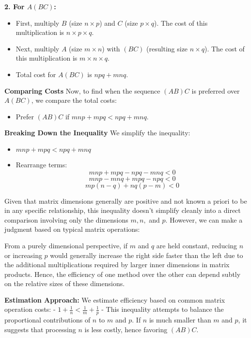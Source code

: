 \documentclass[8pt]{article}
\begin{document}
\textbf{2. For \(A(BC)\):}
   \begin{itemize}
       \item First, multiply \( B \) (size \( n \times p \)) and \( C \) (size \( p \times q \)). The cost of this multiplication is \( n \times p \times q \).
       \item Next, multiply \( A \) (size \( m \times n \)) with \( (BC) \) (resulting size \( n \times q \)). The cost of this multiplication is \( m \times n \times q \).
       \item Total cost for \(A(BC)\) is \( npq + mnq \).
   \end{itemize}

\textbf{Comparing Costs}
Now, to find when the sequence \((AB)C\) is preferred over \(A(BC)\), we compare the total costs:
\begin{itemize}
    \item Prefer \((AB)C\) if \( mnp + mpq < npq + mnq \).
\end{itemize}

\textbf{Breaking Down the Inequality}
We simplify the inequality:
\begin{itemize}
    \item \( mnp + mpq < npq + mnq \)
    \item Rearrange terms:
    \[ mnp + mpq - npq - mnq < 0 \]
  \[ mnp - mnq + mpq - npq < 0 \]
    \[ mp(n-q) + nq(p-m) < 0 \]
\end{itemize}

Given that matrix dimensions generally are positive and not known a priori to be in any specific relationship, this inequality doesn't simplify cleanly into a direct comparison involving only the dimensions \(m, n,\) and \(p\). However, we can make a judgment based on typical matrix operations:

From a purely dimensional perspective, if \( m \) and \( q \) are held constant, reducing \( n \) or increasing \( p \) would generally increase the right side faster than the left due to the additional multiplications required by larger inner dimensions in matrix products. Hence, the efficiency of one method over the other can depend subtly on the relative sizes of these dimensions.

\textbf{Estimation Approach:}
We estimate efficiency based on common matrix operation costs:
- \(1 + \frac{1}{n} < \frac{1}{m} + \frac{1}{p}\)
  - This inequality attempts to balance the proportional contributions of \(n\) to \(m\) and \(p\). If \(n\) is much smaller than \(m\) and \(p\), it suggests that processing \(n\) is less costly, hence favoring \((AB)C\).
\end{document}
